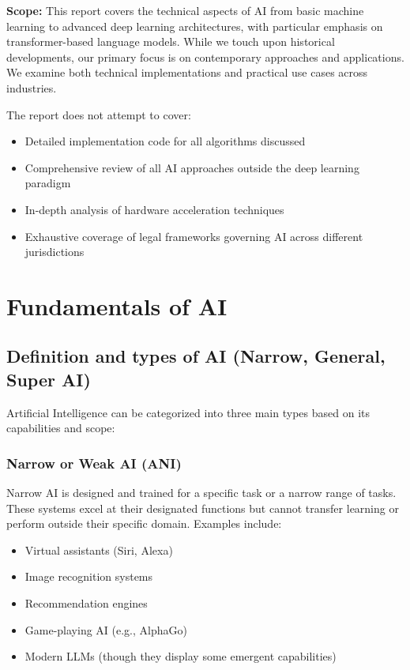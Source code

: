 \documentclass[11pt,a4paper]{report}
\begin{document}
\textbf{Scope:} This report covers the technical aspects of AI from basic machine learning to advanced deep learning architectures, with particular emphasis on transformer-based language models. While we touch upon historical developments, our primary focus is on contemporary approaches and applications. We examine both technical implementations and practical use cases across industries.

The report does not attempt to cover:
\begin{itemize}
    \item Detailed implementation code for all algorithms discussed
    \item Comprehensive review of all AI approaches outside the deep learning paradigm
    \item In-depth analysis of hardware acceleration techniques
    \item Exhaustive coverage of legal frameworks governing AI across different jurisdictions
\end{itemize}

\chapter{Fundamentals of AI}
\section{Definition and types of AI (Narrow, General, Super AI)}

Artificial Intelligence can be categorized into three main types based on its capabilities and scope:

\subsection{Narrow or Weak AI (ANI)}
Narrow AI is designed and trained for a specific task or a narrow range of tasks. These systems excel at their designated functions but cannot transfer learning or perform outside their specific domain. Examples include:

\begin{itemize}
    \item Virtual assistants (Siri, Alexa)
    \item Image recognition systems
    \item Recommendation engines
    \item Game-playing AI (e.g., AlphaGo)
    \item Modern LLMs (though they display some emergent capabilities)
\end{itemize}
\end{document}
